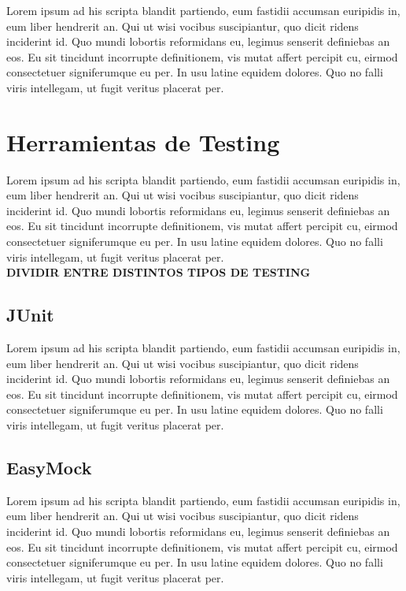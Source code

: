 Lorem ipsum ad his scripta blandit partiendo, eum fastidii accumsan euripidis in, eum liber hendrerit an. Qui ut wisi vocibus suscipiantur, quo dicit ridens inciderint id. Quo mundi lobortis reformidans eu, legimus senserit definiebas an eos. Eu sit tincidunt incorrupte definitionem, vis mutat affert percipit cu, eirmod consectetuer signiferumque eu per. In usu latine equidem dolores. Quo no falli viris intellegam, ut fugit veritus placerat per.

\section{Herramientas de Testing}
Lorem ipsum ad his scripta blandit partiendo, eum fastidii accumsan euripidis in, eum liber hendrerit an. Qui ut wisi vocibus suscipiantur, quo dicit ridens inciderint id. Quo mundi lobortis reformidans eu, legimus senserit definiebas an eos. Eu sit tincidunt incorrupte definitionem, vis mutat affert percipit cu, eirmod consectetuer signiferumque eu per. In usu latine equidem dolores. Quo no falli viris intellegam, ut fugit veritus placerat per.\\
\textbf{DIVIDIR ENTRE DISTINTOS TIPOS DE TESTING}

\subsection{JUnit}
Lorem ipsum ad his scripta blandit partiendo, eum fastidii accumsan euripidis in, eum liber hendrerit an. Qui ut wisi vocibus suscipiantur, quo dicit ridens inciderint id. Quo mundi lobortis reformidans eu, legimus senserit definiebas an eos. Eu sit tincidunt incorrupte definitionem, vis mutat affert percipit cu, eirmod consectetuer signiferumque eu per. In usu latine equidem dolores. Quo no falli viris intellegam, ut fugit veritus placerat per.

\subsection{EasyMock}
Lorem ipsum ad his scripta blandit partiendo, eum fastidii accumsan euripidis in, eum liber hendrerit an. Qui ut wisi vocibus suscipiantur, quo dicit ridens inciderint id. Quo mundi lobortis reformidans eu, legimus senserit definiebas an eos. Eu sit tincidunt incorrupte definitionem, vis mutat affert percipit cu, eirmod consectetuer signiferumque eu per. In usu latine equidem dolores. Quo no falli viris intellegam, ut fugit veritus placerat per.

